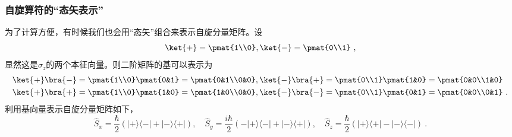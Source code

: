 \subsubsection{自旋算符的“态矢表示”}
为了计算方便，有时候我们也会用“态矢”组合来表示自旋分量矩阵。设
\begin{equation}
\ket{+}=\pmat{1\\0},\ket{-}=\pmat{0\\1}~,
\end{equation}
显然这是$\hat \sigma_z$的两个本征向量。则二阶矩阵的基可以表示为
\begin{equation}
\begin{aligned}
\ket{+}\bra{-}&=\pmat{1\\0}\pmat{0&1}=\pmat{0&1\\0&0},\ket{-}\bra{+}=\pmat{0\\1}\pmat{1&0}=\pmat{0&0\\1&0}\\
\ket{+}\bra{+}&=\pmat{1\\0}\pmat{1&0}=\pmat{1&0\\0&0},\ket{-}\bra{-}=\pmat{0\\1}\pmat{0&1}=\pmat{0&0\\0&1}~.
\end{aligned}
\end{equation}
利用基向量表示自旋分量矩阵如下，
\begin{equation}
\hat S_{x}=\frac{\hbar}{2}(|+\rangle\langle-|+|-\rangle\langle+|), \quad \hat S_{y}=\frac{i \hbar}{2}(-|+\rangle\langle-|+|-\rangle\langle+|), \quad 
\hat S_{z}=\frac{\hbar}{2}(|+\rangle\langle+|-|-\rangle\langle-|)~.
\end{equation}
